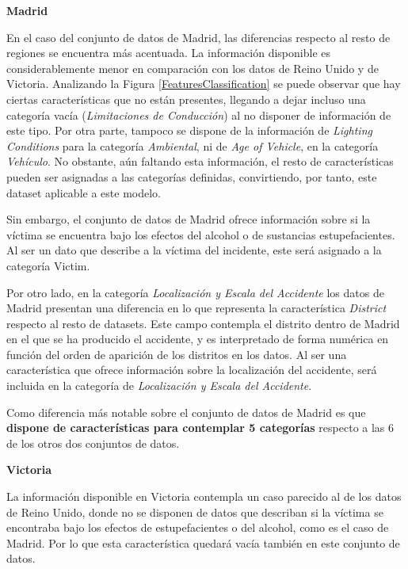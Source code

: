 \textbf{Madrid}


En el caso del conjunto de datos de Madrid, las diferencias respecto al resto de regiones se encuentra más acentuada. La información disponible es considerablemente menor en comparación con los datos de Reino Unido y de Victoria. Analizando la Figura \ref{FeaturesClassification} se puede observar que hay ciertas características que no están presentes, llegando a dejar incluso una categoría vacía (\textit{Limitaciones de Conducción}) al no disponer de información de este tipo. Por otra parte, tampoco se dispone de la información de \textit{Lighting Conditions} para la categoría \textit{Ambiental}, ni de \textit{Age of Vehicle}, en la categoría \textit{Vehículo}. No obstante, aún faltando esta información, el resto de características pueden ser asignadas a las categorías definidas, convirtiendo, por tanto, este dataset aplicable a este modelo.

Sin embargo, el conjunto de datos de Madrid ofrece información sobre si la víctima se encuentra bajo los efectos del alcohol o de sustancias estupefacientes. Al ser un dato que describe a la víctima del incidente, este será asignado a la categoría Victim.

Por otro lado, en la categoría \textit{Localización y Escala del Accidente} los datos de Madrid presentan una diferencia en lo que representa la característica \textit{District} respecto al resto de datasets. Este campo contempla el distrito dentro de Madrid en el que se ha producido el accidente, y es interpretado de forma numérica en función del orden de aparición de los distritos en los datos. Al ser una característica que ofrece información sobre la localización del accidente, será incluida en la categoría de \textit{Localización y Escala del Accidente}.

Como diferencia más notable sobre el conjunto de datos de Madrid es que \textbf{dispone de características para contemplar 5 categorías} respecto a las 6 de los otros dos conjuntos de datos.

\textbf{Victoria}

La información disponible en Victoria contempla un caso parecido al de los datos de Reino Unido, donde no se disponen de datos que describan si la víctima se encontraba bajo los efectos de estupefacientes o del alcohol, como es el caso de Madrid. Por lo que esta característica quedará vacía también en este conjunto de datos.


